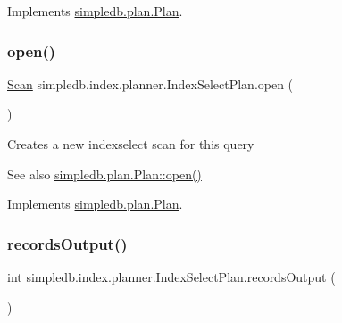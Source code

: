 Implements \hyperlink{interfacesimpledb_1_1plan_1_1Plan_a55094c16c756b0c09b5c71b94d573271}{simpledb.\+plan.\+Plan}.

\mbox{\label{classsimpledb_1_1index_1_1planner_1_1IndexSelectPlan_af1acee7f900bcacf37d2ff1100a31545}} 
\subsubsection{\texorpdfstring{open()}{open()}}
{\footnotesize\ttfamily \hyperlink{interfacesimpledb_1_1query_1_1Scan}{Scan} simpledb.\+index.\+planner.\+Index\+Select\+Plan.\+open (\begin{DoxyParamCaption}{ }\end{DoxyParamCaption})\hspace{0.3cm}{\ttfamily [inline]}}

Creates a new indexselect scan for this query \begin{DoxySeeAlso}{See also}
\hyperlink{interfacesimpledb_1_1plan_1_1Plan_aaa4c15cda4e9c0d52308850f9f13ff99}{simpledb.\+plan.\+Plan\+::open()} 
\end{DoxySeeAlso}


Implements \hyperlink{interfacesimpledb_1_1plan_1_1Plan_aaa4c15cda4e9c0d52308850f9f13ff99}{simpledb.\+plan.\+Plan}.

\mbox{\label{classsimpledb_1_1index_1_1planner_1_1IndexSelectPlan_abbbff69541cb3700bf74674f851297bc}} 
\subsubsection{\texorpdfstring{records\+Output()}{recordsOutput()}}
{\footnotesize\ttfamily int simpledb.\+index.\+planner.\+Index\+Select\+Plan.\+records\+Output (\begin{DoxyParamCaption}{ }\end{DoxyParamCaption})\hspace{0.3cm}{\ttfamily [inline]}}

